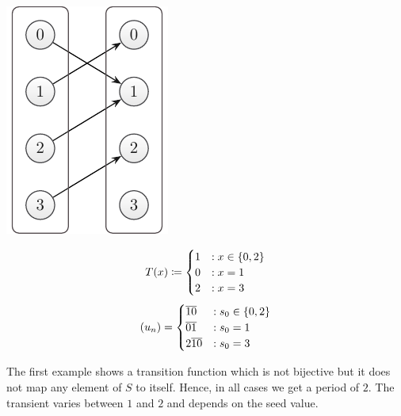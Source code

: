 \documentclass{stdlocal}
\begin{document}
    \medskip
    \begin{minipage}{0.25\textwidth}
      \includegraphics[width=\textwidth]{figures/periodicity_example_a.pdf}
    \end{minipage}
    \hfill
    \begin{minipage}{0.73\textwidth}
      \[
        T(x) \define
        \begin{cases}
          1 &: x \in \set{0,2}{} \\
          0 &: x = 1 \\
          2 &: x = 3
        \end{cases}
      \]
      \[
        (u_n) =
        \begin{cases}
          \overline{10} &: s_0 \in \set{0,2}{} \\
          \overline{01} &: s_0 = 1 \\
          2\overline{10} &: s_0 = 3
        \end{cases}
      \]
    \end{minipage}
    \smallskip
    \par
    \noindent
    The first example shows a transition function which is not bijective but it does not map any element of $S$ to itself.
    Hence, in all cases we get a period of $2$.
    The transient varies between $1$ and $2$ and depends on the seed value.
\end{document}
